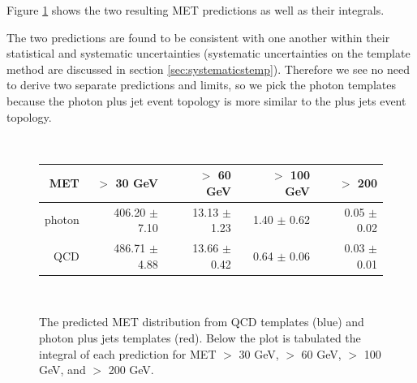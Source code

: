 Figure \ref{fig:comptemp} shows the two resulting MET predictions as well as their integrals.

The two predictions are found to be consistent with one another within their statistical and 
systematic uncertainties (systematic uncertainties on the template method are discussed in 
section \ref{sec:systematicstemp}). Therefore we see no need to derive two separate predictions 
and limits, so we pick the photon templates because the photon plus jet event topology is 
more similar to the \Z plus jets event topology.

\begin{figure}[hbt]
  \begin{center}
	\\ \medskip
    \begin{tabular}{r|r|r|r|r}
      MET    & $>$ 30 GeV       & $>$ 60 GeV        & $>$ 100 GeV       & $>$ 200  \\ \hline

	  photon & 406.20 $\pm$   7.10 &  13.13 $\pm$   1.23 &   1.40 $\pm$   0.62 &   0.05 $\pm$   0.02 \\
	  QCD    & 486.71 $\pm$   4.88 &  13.66 $\pm$   0.42 &   0.64 $\pm$   0.06 &   0.03 $\pm$   0.01 \\

    \end{tabular}
	\\ \medskip
    \caption{The predicted MET distribution from QCD templates (blue) and photon plus jets
	  templates (red). %
	  Below the plot is tabulated the integral of each prediction for
	  MET $>$ 30 GeV, $>$ 60 GeV, $>$ 100 GeV, and $>$ 200 GeV. 
	}
    \label{fig:comptemp}
  \end{center}
\end{figure}
